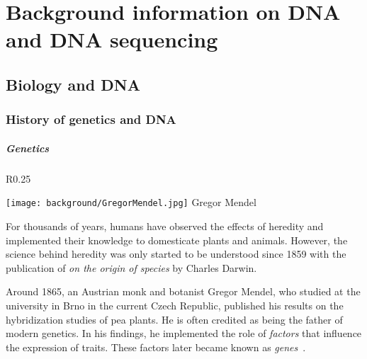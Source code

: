 
\chapter{Background information on DNA and DNA sequencing}
\label{ch:MBbackground}

\section{Biology and DNA}

\subsection{History of genetics and DNA}

\paragraph{Genetics}

\begin{wrapfigure}{R}{0.25\textwidth}
	\begin{center}
		\texttt{[image: background/GregorMendel.jpg]}
		Gregor Mendel
	\end{center}
\end{wrapfigure}


For thousands of years, humans have observed the effects of heredity and implemented their knowledge to domesticate plants and animals. However, the science behind heredity was only started to be understood since 1859 with the publication of \emph{on the origin of species} by Charles Darwin. 

Around 1865, an Austrian monk and botanist Gregor Mendel, who studied at the university in Brno in the current Czech Republic, published his results on the hybridization studies of pea plants. He is often credited as being the father of modern genetics. In his findings, he implemented the role of \emph{factors} that influence the expression of traits. These factors later became known as \emph{genes}~\cite{Mendel}.

